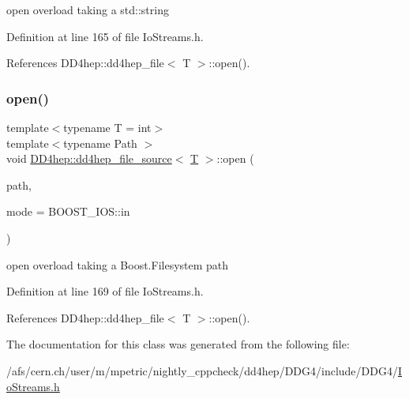 open overload taking a std\+::string 



Definition at line 165 of file Io\+Streams.\+h.



References D\+D4hep\+::dd4hep\+\_\+file$<$ T $>$\+::open().

\hypertarget{class_d_d4hep_1_1dd4hep__file__source_a4bec0d30d5cbb97c505726ce8c9b1712}{}\label{class_d_d4hep_1_1dd4hep__file__source_a4bec0d30d5cbb97c505726ce8c9b1712} 
\subsubsection{\texorpdfstring{open()}{open()}\hspace{0.1cm}{\footnotesize\ttfamily [4/4]}}
{\footnotesize\ttfamily template$<$typename T = int$>$ \\
template$<$typename Path $>$ \\
void \hyperlink{class_d_d4hep_1_1dd4hep__file__source}{D\+D4hep\+::dd4hep\+\_\+file\+\_\+source}$<$ \hyperlink{class_t}{T} $>$\+::open (\begin{DoxyParamCaption}\item[{const \hyperlink{class_d_d4hep_1_1_path}{Path} \&}]{path,  }\item[{B\+O\+O\+S\+T\+\_\+\+I\+O\+S\+::openmode}]{mode = {\ttfamily BOOST\+\_\+IOS\+:\+:in} }\end{DoxyParamCaption})\hspace{0.3cm}{\ttfamily [inline]}}



open overload taking a Boost.\+Filesystem path 



Definition at line 169 of file Io\+Streams.\+h.



References D\+D4hep\+::dd4hep\+\_\+file$<$ T $>$\+::open().



The documentation for this class was generated from the following file\+:\begin{DoxyCompactItemize}
\item 
/afs/cern.\+ch/user/m/mpetric/nightly\+\_\+cppcheck/dd4hep/\+D\+D\+G4/include/\+D\+D\+G4/\hyperlink{_io_streams_8h}{Io\+Streams.\+h}\end{DoxyCompactItemize}
